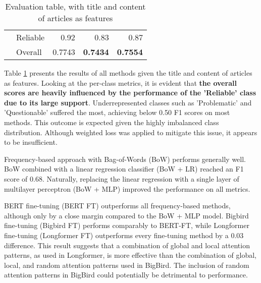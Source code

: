 \begin{table}[htbp]
\begin{longtable}{| c | l | r | r | r |}
                                                          & Reliable           & 0.92               & 0.83            & 0.87            \\\cline{2-5}
                                                          & Overall            & 0.7743             & \textbf{0.7434} & \textbf{0.7554} \\
        \hline
    \end{longtable}
    \caption{Evaluation table, with title and content of articles as features}
    \label{table:eval}
\end{table}

Table \ref{table:eval} presents the results of all methods given the title and content of articles as features. Looking at the per-class metrics, it is evident that \textbf{the overall scores are heavily influenced by the performance of the 'Reliable' class due to its large support}. Underrepresented classes such as 'Problematic' and 'Questionable' suffered the most, achieving below 0.50 F1 scores on most methods. This outcome is expected given the highly imbalanced class distribution. Although weighted loss was applied to mitigate this issue, it appears to be insufficient.

Frequency-based approach with Bag-of-Words (BoW) performs generally well. BoW combined with a linear regression classifier (BoW + LR) reached an F1 score of 0.68.  Naturally, replacing the linear regression with a single layer of multilayer perceptron (BoW + MLP) improved the performance on all metrics.

BERT fine-tuning (BERT FT) outperforms all frequency-based methods, although only by a close margin compared to the BoW + MLP model. Bigbird fine-tuning (Bigbird FT) performs comparably to BERT-FT, while Longformer fine-tuning (Longformer FT) outperforms every fine-tuning method by a 0.03 difference. This result suggests that a combination of global and local attention patterns, as used in Longformer, is more effective than the combination of global, local, and random attention patterns used in BigBird. The inclusion of random attention patterns in BigBird could potentially be detrimental to performance.

